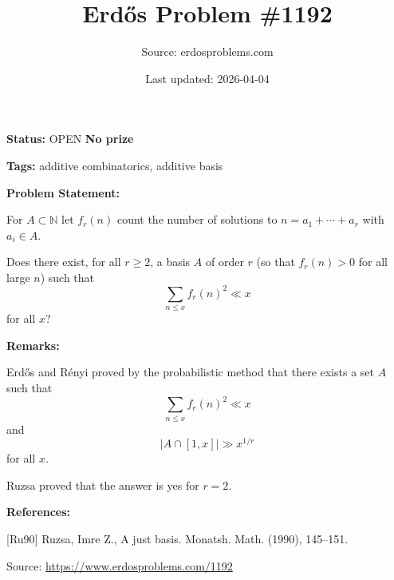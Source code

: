 \documentclass{article}
\title{Erd\H{o}s Problem \#1192}
\date{Last updated: 2026-04-04}
\author{Source: erdosproblems.com}
\begin{document}
\maketitle

\noindent\textbf{Status:} OPEN \quad \textbf{No prize}

\noindent\textbf{Tags:} additive combinatorics, additive basis

\medskip
\noindent\textbf{Problem Statement:}

For $A\subset \mathbb{N}$ let $f_r(n)$ count the number of solutions to $n=a_1+\cdots+a_r$ with $a_i\in A$.

Does there exist, for all $r\geq 2$, a basis $A$ of order $r$ (so that $f_r(n)>0$ for all large $n$) such that\[\sum_{n\leq x}f_r(n)^2 \ll x\]for all $x$?

\bigskip
\noindent\textbf{Remarks:}

Erd\H{o}s and R\'{e}nyi proved by the probabilistic method that there exists a set $A$ such that\[\sum_{n\leq x}f_r(n)^2 \ll x\]and\[\lvert A\cap [1,x]\rvert\gg x^{1/r}\]for all $x$. 

Ruzsa \cite{Ru90} proved that the answer is yes for $r=2$.

\bigskip
\noindent\textbf{References:}

[Ru90] Ruzsa, Imre Z., A just basis. Monatsh. Math. (1990), 145--151.

\bigskip
\noindent\small{Source: \url{https://www.erdosproblems.com/1192}}
\end{document}
